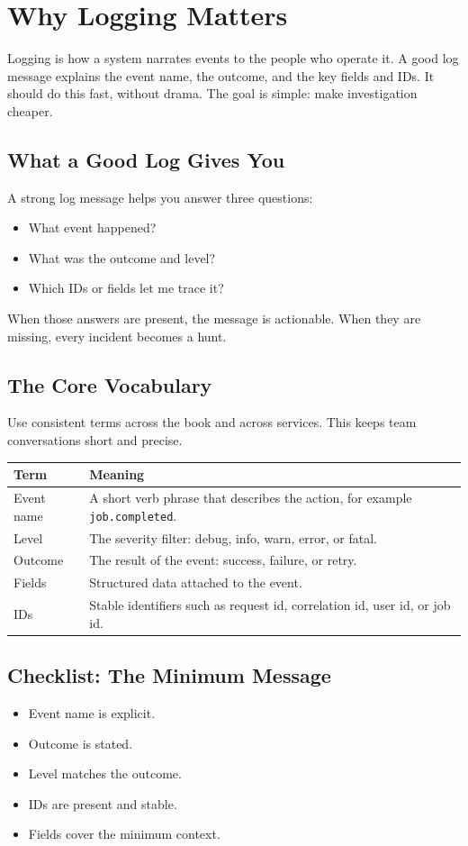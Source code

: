 \chapter{Why Logging Matters}
Logging is how a system narrates events to the people who operate it. A good log message explains the event name, the outcome, and the key fields and IDs. It should do this fast, without drama. The goal is simple: make investigation cheaper.

\section{What a Good Log Gives You}
A strong log message helps you answer three questions:
\begin{itemize}
\item What event happened?
\item What was the outcome and level?
\item Which IDs or fields let me trace it?
\end{itemize}

When those answers are present, the message is actionable. When they are missing, every incident becomes a hunt.

\section{The Core Vocabulary}
Use consistent terms across the book and across services. This keeps team conversations short and precise.

\begin{table}[h]
\centering
\begin{tabularx}{\textwidth}{lX}
\toprule
Term & Meaning \\
\midrule
Event name & A short verb phrase that describes the action, for example \texttt{job.completed}. \\
Level & The severity filter: debug, info, warn, error, or fatal. \\
Outcome & The result of the event: success, failure, or retry. \\
Fields & Structured data attached to the event. \\
IDs & Stable identifiers such as request id, correlation id, user id, or job id. \\
\bottomrule
\end{tabularx}
\end{table}

\section{Checklist: The Minimum Message}
\begin{itemize}
\item Event name is explicit.
\item Outcome is stated.
\item Level matches the outcome.
\item IDs are present and stable.
\item Fields cover the minimum context.
\end{itemize}

